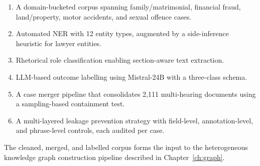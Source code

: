 \begin{enumerate}
    \item A domain-bucketed corpus spanning family/matrimonial, financial fraud, land/property, motor accidents, and sexual offence cases.
    \item Automated NER with 12 entity types, augmented by a side-inference heuristic for lawyer entities.
    \item Rhetorical role classification enabling section-aware text extraction.
    \item LLM-based outcome labelling using Mistral-24B with a three-class schema.
    \item A case merger pipeline that consolidates 2,111 multi-hearing documents using a sampling-based containment test.
    \item A multi-layered leakage prevention strategy with field-level, annotation-level, and phrase-level controls, each audited per case.
\end{enumerate}

The cleaned, merged, and labelled corpus forms the input to the heterogeneous knowledge graph construction pipeline described in Chapter~\ref{ch:graph}.
